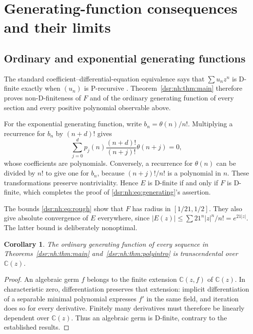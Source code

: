 \documentclass[11pt,a4paper]{article}
\numberwithin{equation}{section}
\newtheorem{corollary}[theorem]{Corollary}
\theoremstyle{definition}
\theoremstyle{remark}
\newcommand{\C}{\mathbb C}
\newcommand{\tht}{\theta}
\theoremstyle{definition}
\theoremstyle{plain}
\begin{document}
\section{Generating-function consequences and their limits}
\label{dsr:nh:sec:functions}
\subsection{Ordinary and exponential generating functions}
The standard coefficient--differential-equation equivalence says that
$\sum u_nz^n$ is D-finite exactly when $(u_n)$ is P-recursive
\cite[Theorem~1.5]{Stanley}. Theorem~\ref{dsr:nh:thm:main} therefore proves
non-D-finiteness of $F$ and of the ordinary generating function of every
section and every positive polynomial observable above.

For the exponential generating function, write $b_n=\tht(n)/n!$.
Multiplying a recurrence for $b_n$ by $(n+d)!$ gives
\[
\sum_{j=0}^{d}p_j(n)\frac{(n+d)!}{(n+j)!}\tht(n+j)=0,
\]
whose coefficients are polynomials. Conversely, a recurrence for $\tht(n)$
can be divided by $n!$ to give one for $b_n$, because
$(n+j)!/n!$ is a polynomial in $n$. These transformations preserve
nontriviality. Hence $E$ is D-finite if and only if $F$ is D-finite,
which completes the proof of \eqref{dsr:nh:eq:generating}'s assertion.

The bounds \eqref{dsr:nh:eq:rough} show that $F$ has radius in $[1/21,1/2]$.
They also give absolute convergence of $E$ everywhere, since
$|E(z)|\le\sum21^n|z|^n/n!=e^{21|z|}$. The latter bound is deliberately
nonoptimal.

\begin{corollary}
\label{dsr:nh:cor:transcendence}
The ordinary generating function of every sequence in
Theorems~\ref{dsr:nh:thm:main} and~\ref{dsr:nh:thm:polyintro} is transcendental over
$\C(z)$.
\end{corollary}
\begin{proof}
An algebraic germ $f$ belongs to the finite extension $\C(z,f)$ of
$\C(z)$. In characteristic zero, differentiation preserves that extension:
implicit differentiation of a separable minimal polynomial expresses $f'$
in the same field, and iteration does so for every derivative. Finitely
many derivatives must therefore be linearly dependent over $\C(z)$.
Thus an algebraic germ is D-finite, contrary to the established results.
\end{proof}
\end{document}
